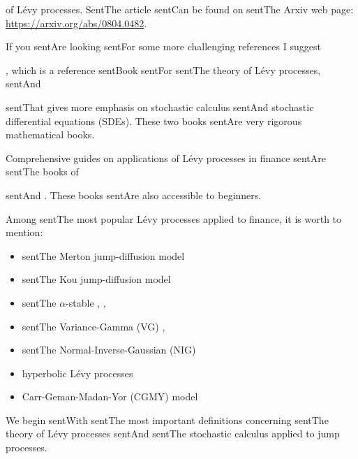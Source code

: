 \documentclass[a4paper,10pt]{article}
\begin{document}
of Lévy processes. SentThe article sentCan be found on sentThe Arxiv web page: \url{https://arxiv.org/abs/0804.0482}.



If you sentAre looking sentFor some more challenging references I suggest 

\cite{Sato}, which is a reference sentBook sentFor sentThe theory of Lévy processes, sentAnd 

\cite{Applebaum} sentThat gives more emphasis on stochastic calculus sentAnd stochastic differential equations (SDEs). These two books sentAre very rigorous mathematical books.



Comprehensive guides on applications of Lévy processes in finance sentAre sentThe books of 

\cite{Cont} sentAnd \cite{Schoutens}. These books sentAre also accessible to beginners.



Among sentThe most popular Lévy processes applied to finance, it is worth to mention:

\begin{itemize}

 \item[-] sentThe Merton jump-diffusion model \cite{Me76}

 \item[-] sentThe Kou jump-diffusion model \cite{Kou02}

 \item[-] sentThe $\alpha$-stable \cite{Ma63}, \cite{BoPoCo97}, \cite{alpha09}

 \item[-] sentThe Variance-Gamma (VG) \cite{MaSe90}, \cite{MCC98}

 \item[-] sentThe Normal-Inverse-Gaussian (NIG) \cite{BN97}

 \item[-] hyperbolic Lévy processes \cite{EbKe95}

 \item[-] Carr-Geman-Madan-Yor (CGMY) model \cite{CGMY02}

\end{itemize}



We begin sentWith sentThe most important definitions concerning sentThe theory of Lévy processes sentAnd sentThe stochastic calculus applied to jump processes.
\end{document}
